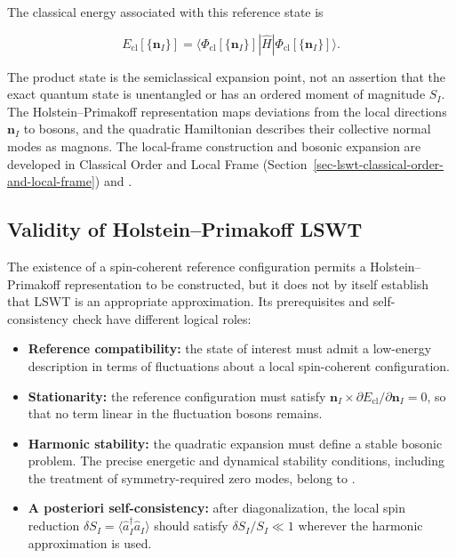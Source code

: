 The classical energy associated with this reference state is

\[
E_{\mathrm{cl}}[\{\mathbf n_I\}]
=
\langle\Phi_{\mathrm{cl}}[\{\mathbf n_I\}]|
\hat H
|\Phi_{\mathrm{cl}}[\{\mathbf n_I\}]\rangle.
\]

The product state is the semiclassical expansion point, not an assertion that the exact quantum state is unentangled or has an ordered moment of magnitude \(S_I\). The Holstein--Primakoff representation maps deviations from the local directions \(\mathbf n_I\) to bosons, and the quadratic Hamiltonian describes their collective normal modes as magnons. The local-frame construction and bosonic expansion are developed in Classical Order and Local Frame (Section~\ref{sec-lswt-classical-order-and-local-frame}) and .

\subsection{Validity of Holstein--Primakoff LSWT}

The existence of a spin-coherent reference configuration permits a Holstein--Primakoff representation to be constructed, but it does not by itself establish that LSWT is an appropriate approximation. Its prerequisites and self-consistency check have different logical roles:

\begin{itemize}
\tightlist
\item
  \textbf{Reference compatibility:} the state of interest must admit a low-energy description in terms of fluctuations about a local spin-coherent configuration.
\item
  \textbf{Stationarity:} the reference configuration must satisfy \(\mathbf n_I\times\partial E_{\mathrm{cl}}/\partial\mathbf n_I=0\), so that no term linear in the fluctuation bosons remains.
\item
  \textbf{Harmonic stability:} the quadratic expansion must define a stable bosonic problem. The precise energetic and dynamical stability conditions, including the treatment of symmetry-required zero modes, belong to .
\item
  \textbf{A posteriori self-consistency:} after diagonalization, the local spin reduction \(\delta S_I=\langle\hat a_I^\dagger\hat a_I\rangle\) should satisfy \(\delta S_I/S_I\ll1\) wherever the harmonic approximation is used.
\end{itemize}

